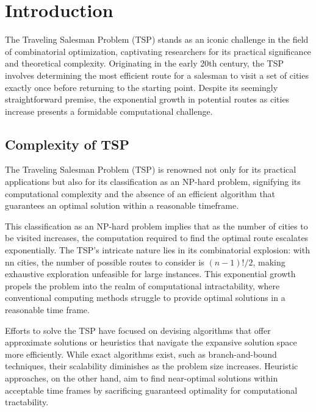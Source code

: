 \chapter{Introduction}

The Traveling Salesman Problem (TSP) stands as an iconic challenge in the field of combinatorial optimization,
captivating researchers for its practical significance and theoretical complexity. Originating in the early 20th century,
the TSP involves determining the most efficient route for a salesman to visit a set of cities exactly once before returning 
to the starting point. Despite its seemingly straightforward premise, the exponential growth in potential routes as cities 
increase presents a formidable computational challenge.

\section{Complexity of TSP}

The Traveling Salesman Problem (TSP) is renowned not only for its practical applications but also for its classification as an NP-hard problem, signifying its computational complexity and the absence of an efficient algorithm that guarantees an optimal solution within a reasonable timeframe.

This classification as an NP-hard problem implies that as the number of cities to be visited increases, the computation required to find the optimal route escalates exponentially. The TSP's intricate nature lies in its combinatorial explosion: with nn cities, the number of possible routes to consider is $(n-1)!/2$, making exhaustive exploration unfeasible for large instances. This exponential growth propels the problem into the realm of computational intractability, where conventional computing methods struggle to provide optimal solutions in a reasonable time frame.

Efforts to solve the TSP have focused on devising algorithms that offer approximate solutions or heuristics that navigate the expansive solution space more efficiently. While exact algorithms exist, such as branch-and-bound techniques, their scalability diminishes as the problem size increases. Heuristic approaches, on the other hand, aim to find near-optimal solutions within acceptable time frames by sacrificing guaranteed optimality for computational tractability.

